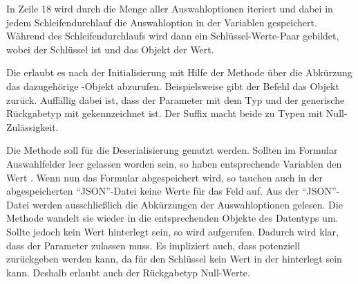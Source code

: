 In Zeile 18 wird durch die  Menge aller Auswahloptionen  iteriert und dabei in jedem Schleifendurchlauf die Auswahloption in der Variablen  gespeichert.
Während des Schleifendurchlaufs wird dann ein Schlüssel-Werte-Paar gebildet, wobei  der Schlüssel ist und das Objekt  der Wert.

Die   erlaubt es nach der Initialisierung mit Hilfe der Methode   über die Abkürzung das dazugehörige -Objekt abzurufen.
Beispielsweise gibt der Befehl  das Objekt  zurück.
Auffällig dabei ist, dass der Parameter  mit dem Typ  und der generische Rückgabetyp mit  gekennzeichnet ist. Der Suffix  macht beide zu Typen mit Null-Zulässigkeit.



Die Methode  soll für die Deserialisierung genutzt werden.
 Sollten im Formular Auswahlfelder leer gelassen worden sein, so haben  entsprechende Variablen den Wert .
Wenn nun das Formular abgespeichert wird, so tauchen auch in der abgespeicherten \enquote{JSON}-Datei keine Werte für das Feld auf.
Aus der \enquote{JSON}-Datei werden ausschließlich die Abkürzungen der Auswahloptionen gelesen. Die Methode  wandelt sie wieder in die entsprechenden Objekte des Datentyps  um.
Sollte jedoch kein Wert hinterlegt sein, so wird  aufgerufen. Dadurch wird klar,
dass der Parameter  zulassen muss.
Es impliziert auch,
dass potenziell  zurückgeben werden kann, da für den Schlüssel  kein Wert in der  hinterlegt sein kann. Deshalb  erlaubt auch der Rückgabetyp  Null-Werte.
